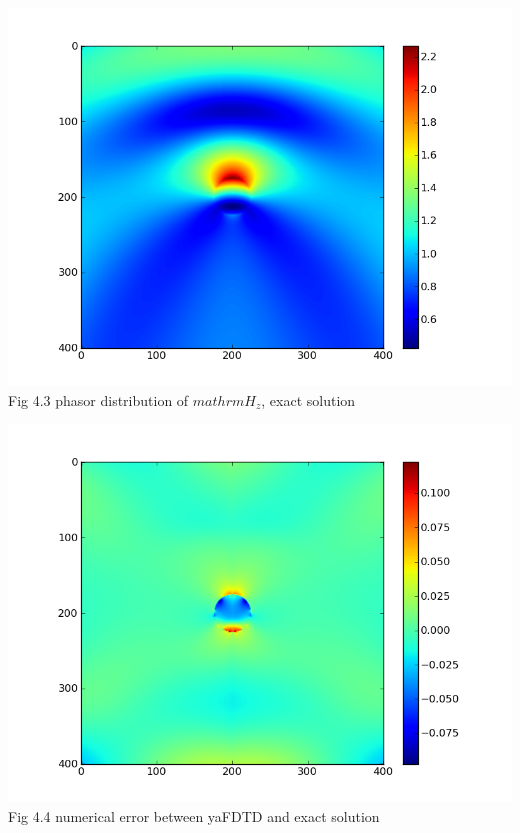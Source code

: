 \documentclass[openany]{book}
\begin{document}
\begin{center}
\includegraphics[scale=0.8]{images/phasor-exam-exact.png}\\
Fig 4.3
phasor distribution of $mathrm{H_z}$, exact solution
\end{center}
\begin{center}
\includegraphics[scale=0.8]{images/errors.png}\\
Fig 4.4
numerical error between yaFDTD and exact solution
\end{center}
\end{document}
